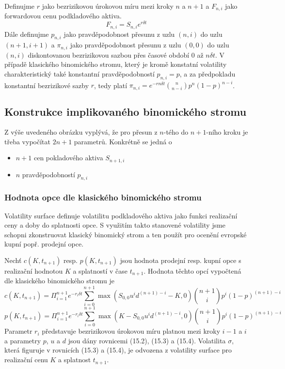 \documentclass[a4paper]{book}
\begin{document}
Definujme $r$ jako bezrizikovou úrokovou míru mezi kroky $n$ a $n+1$ a $F_{n,i}$ jako forwardovou cenu podkladového aktiva.
\begin{equation}
F_{n,i} = S_{n,i}e^{r \delta t}
\end{equation}
Dále definujme $p_{n,i}$ jako pravděpodobnost přesunu z uzlu $(n,i)$ do uzlu $(n+1, i + 1)$ a $\pi_{n,i}$ jako pravděpodobnost přesunu z uzlu $(0,0)$ do uzlu $(n,i)$ diskontovanou bezrizikovou sazbou přes časové období $0$ až $n \delta t$. V případě klasického binomického stromu, který je kromě konstatní volatility charakteristický také konstantní pravděpodobností $p_{n,i}=p$, a za předpokladu konstantní bezrizikové sazby $r$, tedy platí $\pi_{n,i}=e^{-rn \delta t}\binom{n}{n-i}p^n(1-p)^{n-i}$.

\subsection{Konstrukce implikovaného binomického stromu}

Z výše uvedeného obrázku vyplývá, že pro přesun z $n$-tého do $n+1$-ního kroku je třeba vypočítat $2n+1$ parametrů. Konkrétně se jedná o
\begin{itemize}
\item $n+1$ cen pokladového aktiva $S_{n+1,i}$
\item $n$ pravděpodobností $p_{n,i}$
\end{itemize}

\subsubsection{Hodnota opce dle klasického binomického stromu}

Volatility surface definuje volatilitu podkladového aktiva jako funkci realizační ceny a doby do splatnosti opce. S využitím takto stanovené volatility jsme schopni zkonstruovat klasický binomický strom a ten použít pro ocenění evropské kupní popř. prodejní opce.

Nechť $c(K, t_{n+1})$ resp. $p(K, t_{n+1})$ jsou hodnota prodejní resp. kupní opce s realizační hodnotou $K$ a splatností v čase $t_{n+1}$. Hodnota těchto opcí vypočtená dle klasického binomického stromu je
\begin{equation}
c(K, t_{n+1}) = \Pi_{i=1}^{n+1}e^{-r_i \delta t} \sum_{i = 0}^{n+1} \max(S_{0,0}u^id^{(n+1)-i}-K,0)\binom{n+1}{i}p^i(1-p)^{(n+1)-i}
\end{equation}
\begin{equation}
p(K, t_{n+1}) = \Pi_{i=1}^{n+1}e^{-r_i \delta t} \sum_{i = 0}^{n+1}\max(K-S_{0,0}u^id^{(n+1)-i},0)\binom{n+1}{i}p^i(1-p)^{(n+1)-i}
\end{equation}
Parametr $r_i$ představuje bezrizikovou úrokovou míru platnou mezi kroky $i-1$ a $i$ a parametry $p$, $u$ a $d$ jsou dány rovnicemi (15.2), (15.3) a (15.4). Volatilita $\sigma$, která figuruje v rovnicích (15.3) a (15.4), je odvozena z volatility surface pro realizační cenu $K$ a splatnost $t_{n+1}$.
\end{document}
